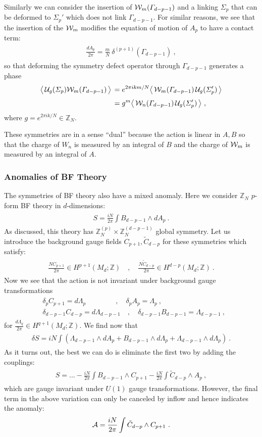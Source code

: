 \documentclass[11pt]{article}
\newcommand{\eq}[1]{\begin{align}\begin{split}#1\end{split}\end{align}}
\newcommand{\twopi}[1]{{\frac{#1}{2\pi}}}
\def\CA{{\cal A}}
\def\CW {{\cal W}}
\def\CU {{\cal U}}
\def\IZ{{\mathbb{Z}}}
\begin{document}
Similarly we can consider the insertion of $\CW_m(\Gamma_{d-p-1})$ and a linking $\Sigma_p$ that can be deformed to $\Sigma_p'$ which does not link $\Gamma_{d-p-1}$. For similar reasons, we see that the insertion of the $\CW_m$ modifies the equation of motion of $A_p$ to have a contact term:
\eq{
\twopi{dA_p}=\frac{m}{N}\ \delta^{(p+1)}(\Gamma_{d-p-1})~, 
}
so that deforming the symmetry defect operator through $\Gamma_{d-p-1}$ generates a phase 
\eq{
\big\langle\, \CU_g(\Sigma_{p})\CW_m(\Gamma_{d-p-1})\,\big\rangle\,&=e^{2\pi i k m/N}\big\langle\, \CW_m(\Gamma_{d-p-1})\,\CU_g(\Sigma_{p}')\,\big\rangle\\[0.1cm]
&=g^m\big\langle\, \CW_n(\Gamma_{d-p-1})\,\CU_g(\Sigma_{p}')\,\big\rangle~,
}
where $g=e^{2\pi i k /N}\in \IZ_N$. 

These symmetries are in a sense ``dual'' because the action is linear in $A,B$ so that the charge of $W_n$ is measured by an integral of $B$ and the charge of $\CW_m$ is measured by an integral of $A$. 

\subsubsection{Anomalies of BF Theory}


The symmetries of BF theory also have a mixed anomaly. Here we consider $\IZ_N$ $p$-form BF theory in $d$-dimensions:
\eq{
S=\twopi{i N} \int B_{d-p-1}\wedge dA_p~.
}
 As discussed, this theory has  $\IZ_N^{(p)}\times \IZ_N^{(d-p-1)}$ global symmetry. Let us introduce the background gauge fields $C_{p+1},\tilde{C}_{d-p}$ for these symmetries which satisfy:
 \eq{
\twopi{ NC_{p+1}}\in H^{p+1}(M_d;\IZ)\quad, \quad \twopi{N\tilde{C}_{d-p}}\in H^{d-p}(M_d;\IZ)~.}
  Now we see that the action is not invariant under background gauge transformations 
 \eq{
&\delta_p C_{p+1}=d\Lambda_{p}\qquad\qquad~, \quad \delta_p A_p=\Lambda_p~,\\
&\delta_{d-p-1} C_{d-p}=d\Lambda_{d-p-1}\quad, \quad \delta_{d-p-1} B_{d-p-1}=\Lambda_{d-p-1}~,
 }
 for $\twopi{d\Lambda_q}\in H^{q+1}(M_d;\IZ)$. We find now that 
 \eq{
\delta S=i N\int\left( \Lambda_{d-p-1}\wedge dA_p+B_{d-p-1}\wedge d\Lambda_p+\Lambda_{d-p-1}\wedge d\Lambda_{p}\right)~. 
 }
 As it turns out, the best we can do is eliminate the first two by adding the couplings:
 \eq{
 S=...-\twopi{iN}\int B_{d-p-1}\wedge C_{p+1}-\twopi{i N}\int \tilde{C}_{d-p}\wedge A_p~,
 } 
 which are gauge invariant under $U(1)$ gauge transformations. However, the final term in the above variation can only be canceled by inflow and hence indicates the anomaly:
 \eq{
 \CA=\twopi{i N}\int \tilde{C}_{d-p}\wedge C_{p+1}~. 
 }
\end{document}
